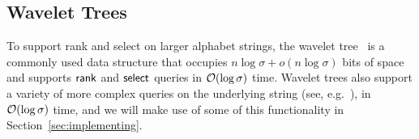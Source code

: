 \subsection{Wavelet Trees} \label{sec:WVT} To support rank and select on larger
alphabet strings, the wavelet tree~\cite{ggv2003,n2013} is a commonly used data
structure that occupies $n\log\sigma + o(n\log\sigma)$ bits of space and
supports $\mathsf{rank}$ and $\mathsf{select}$ queries in $\mathcal{O}\!\left( {\log\sigma} \right)$ time.  Wavelet trees
also support a variety of more complex queries on the underlying string (see,
e.g.~\cite{gnp2012}), in $\mathcal{O}\!\left( {\log\sigma} \right)$ time, and we will make use of some of
this functionality in Section~\ref{sec:implementing}.


%
%
%
%
%
%


